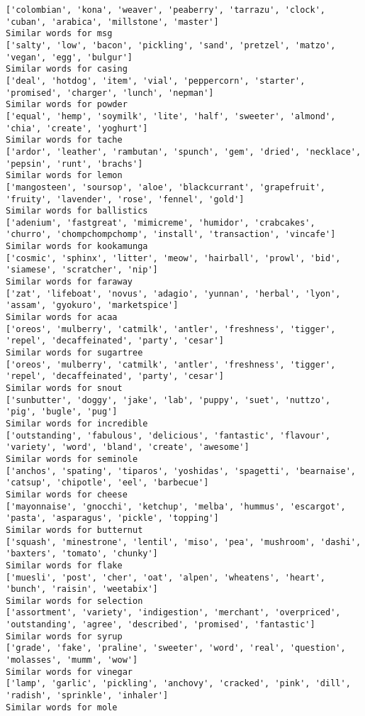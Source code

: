 \documentclass[11pt]{article}
\begin{document}
\begin{Verbatim}[commandchars=\\\{\}]
['colombian', 'kona', 'weaver', 'peaberry', 'tarrazu', 'clock', 'cuban', 'arabica', 'millstone', 'master']
Similar words for msg
['salty', 'low', 'bacon', 'pickling', 'sand', 'pretzel', 'matzo', 'vegan', 'egg', 'bulgur']
Similar words for casing
['deal', 'hotdog', 'item', 'vial', 'peppercorn', 'starter', 'promised', 'charger', 'lunch', 'nepman']
Similar words for powder
['equal', 'hemp', 'soymilk', 'lite', 'half', 'sweeter', 'almond', 'chia', 'create', 'yoghurt']
Similar words for tache
['ardor', 'leather', 'rambutan', 'spunch', 'gem', 'dried', 'necklace', 'pepsin', 'runt', 'brachs']
Similar words for lemon
['mangosteen', 'soursop', 'aloe', 'blackcurrant', 'grapefruit', 'fruity', 'lavender', 'rose', 'fennel', 'gold']
Similar words for ballistics
['adenium', 'fastgreat', 'mimicreme', 'humidor', 'crabcakes', 'churro', 'chompchompchomp', 'install', 'transaction', 'vincafe']
Similar words for kookamunga
['cosmic', 'sphinx', 'litter', 'meow', 'hairball', 'prowl', 'bid', 'siamese', 'scratcher', 'nip']
Similar words for faraway
['zat', 'lifeboat', 'novus', 'adagio', 'yunnan', 'herbal', 'lyon', 'assam', 'gyokuro', 'marketspice']
Similar words for acaa
['oreos', 'mulberry', 'catmilk', 'antler', 'freshness', 'tigger', 'repel', 'decaffeinated', 'party', 'cesar']
Similar words for sugartree
['oreos', 'mulberry', 'catmilk', 'antler', 'freshness', 'tigger', 'repel', 'decaffeinated', 'party', 'cesar']
Similar words for snout
['sunbutter', 'doggy', 'jake', 'lab', 'puppy', 'suet', 'nuttzo', 'pig', 'bugle', 'pug']
Similar words for incredible
['outstanding', 'fabulous', 'delicious', 'fantastic', 'flavour', 'variety', 'word', 'bland', 'create', 'awesome']
Similar words for seminole
['anchos', 'spating', 'tiparos', 'yoshidas', 'spagetti', 'bearnaise', 'catsup', 'chipotle', 'eel', 'barbecue']
Similar words for cheese
['mayonnaise', 'gnocchi', 'ketchup', 'melba', 'hummus', 'escargot', 'pasta', 'asparagus', 'pickle', 'topping']
Similar words for butternut
['squash', 'minestrone', 'lentil', 'miso', 'pea', 'mushroom', 'dashi', 'baxters', 'tomato', 'chunky']
Similar words for flake
['muesli', 'post', 'cher', 'oat', 'alpen', 'wheatens', 'heart', 'bunch', 'raisin', 'weetabix']
Similar words for selection
['assortment', 'variety', 'indigestion', 'merchant', 'overpriced', 'outstanding', 'agree', 'described', 'promised', 'fantastic']
Similar words for syrup
['grade', 'fake', 'praline', 'sweeter', 'word', 'real', 'question', 'molasses', 'mumm', 'wow']
Similar words for vinegar
['lamp', 'garlic', 'pickling', 'anchovy', 'cracked', 'pink', 'dill', 'radish', 'sprinkle', 'inhaler']
Similar words for mole

\end{Verbatim}
\end{document}
